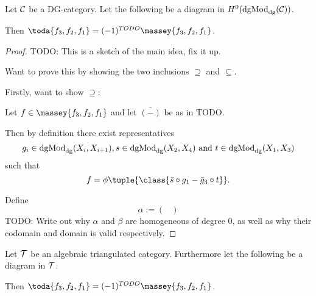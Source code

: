 \begin{theorem}
    Let \( {\mathcal{C}} \) be a DG-category. Let the following be a diagram in \( H^0(\operatorname{dgMod}_{\operatorname{dg}}({\mathcal{C}})) \).
    \begin{center}
    \end{center}
    Then \( \toda{f_3, f_2, f_1} = (-1)^{TODO} \massey{f_3, f_2, f_1} \).
\end{theorem}
\begin{proof}
    TODO: This is a sketch of the main idea, fix it up.

    Want to prove this by showing the two inclusions \( \supseteq \) and \( \subseteq \).

    Firstly, want to show \( \supseteq \):

    Let \( f \in \massey{f_3, f_2, f_1} \) and let \( \bar{(-)} \) be as in TODO.
    
    Then by definition there exist representatives
    \[
        g_i \in \operatorname{dgMod}_{\operatorname{dg}}(X_i, X_{i + 1}), s \in \operatorname{dgMod}_{\operatorname{dg}}(X_2, X_4) \text{ and } t \in \operatorname{dgMod}_{\operatorname{dg}}(X_1, X_3)
    \]
    such that
    \[
        f = \phi\tuple{\class{\bar{s} \circ g_1 - \bar{g}_3 \circ t}}.
    \]

    Define
    \[
        \alpha := 
        \begin{pmatrix}
            
        \end{pmatrix}
    \]
    TODO: Write out why \( \alpha \) and \( \beta \) are homogeneous of degree 0, as well as why their codomain and domain is valid respectively.

    

\end{proof}

\begin{corollary}
    Let \( {\mathcal{T}} \) be an algebraic triangulated category. Furthermore let the following be a diagram in \( {\mathcal{T}} \).
    \begin{center}
    \end{center}
    Then \( \toda{f_3, f_2, f_1} = (-1)^{TODO} \massey{f_3, f_2, f_1} \).
\end{corollary}
